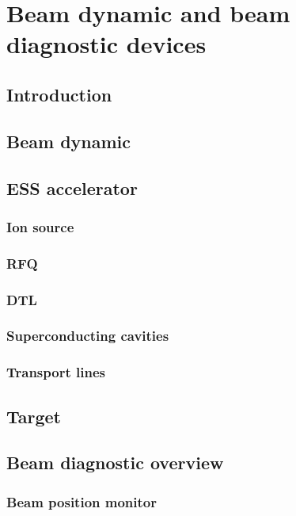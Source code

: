 \chapter{Beam dynamic and beam diagnostic devices}
\cleardoublepage

\minitoc
\section{Introduction}
\begin{refsection}
	\label{ch2:Introduction}

	\section{Beam dynamic}
  \section{ESS accelerator}
  

	\subsection{Ion source}
	\subsection{RFQ}
	\subsection{DTL}
	\subsection{Superconducting cavities}
	\subsection{Transport lines}

	\section{Target}

	\section{Beam diagnostic overview}
	\subsection{Beam position monitor}

\end{refsection}
